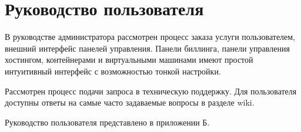 \section{Руководство пользователя}

В руководстве администратора рассмотрен процесс заказа услуги пользователем, внешний интерфейс панелей управления.
Панели биллинга, панели управления хостингом, контейнерами и виртуальными машинами имеют простой интуитивный интерфейс с возможностью тонкой настройки.

Рассмотрен процесс подачи запроса в техническую поддержку.
Для пользователя доступны ответы на самые часто задаваемые вопросы в разделе wiki.

Руководство пользователя представлено в приложении Б.

\clearpage